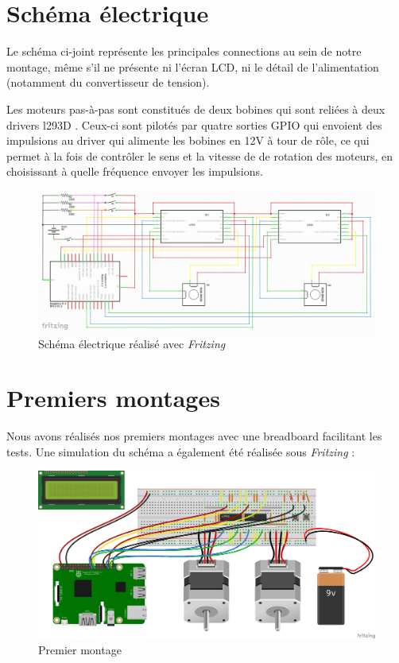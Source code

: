 \documentclass[12pt,a4paper]{report}
\begin{document}
\section{Schéma électrique}
Le schéma ci-joint représente les principales connections au sein de notre montage, même s'il ne présente ni l'écran LCD, ni le détail de l'alimentation (notamment du convertisseur de tension).

Les moteurs pas-à-pas sont constitués de deux bobines qui sont reliées à deux drivers l293D . Ceux-ci sont pilotés par quatre sorties GPIO qui envoient des impulsions au driver qui alimente les bobines en 12V à tour de rôle, ce qui permet à la fois de contrôler le sens et la vitesse de de rotation des moteurs, en choisissant à quelle fréquence envoyer les impulsions.
\begin{figure}[!h]
 \center
 \includegraphics[scale=0.23]{../pictures/Sudoku_schema_electrique.png}
 \caption{Schéma électrique réalisé avec \emph{Fritzing}}
\end{figure}
\newpage
\section{Premiers montages}
Nous avons réalisés nos premiers montages avec une breadboard facilitant les tests. Une simulation du schéma a également été réalisée sous \emph{Fritzing} :


\begin{figure}[!h]
 \center
 \includegraphics[scale=0.45]{../pictures/Sudoku_schema}
 \caption{Premier montage}
\end{figure}
\end{document}
